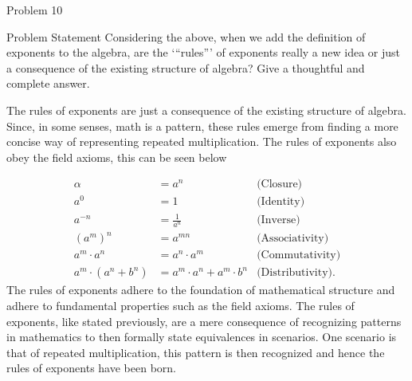\begin{problem}{Problem 10}
    \begin{statement}{Problem Statement}
        Considering the above, when we add the definition of exponents to the algebra, are the `“rules”' of exponents really a new idea or just a consequence of the existing structure of algebra? Give 
        a thoughtful and complete answer.
    \end{statement}

    \begin{highlight}[Solution]
        The rules of exponents are just a consequence of the existing structure of algebra. Since, in some senses, math is a pattern, these rules emerge from finding a more concise way of representing
        repeated multiplication. The rules of exponents also obey the field axioms, this can be seen below

        \begin{align*}
            \alpha & = a^{n} & \text{(Closure)} \\
            a^{0} & = 1 & \text{(Identity)} \\
            a^{-n} & = \frac{1}{a^{n}} & \text{(Inverse)} \\
            (a^{m})^{n} & = a^{mn} & \text{(Associativity)} \\
            a^{m}\cdot a^{n} & = a^{n}\cdot a^{m} & \text{(Commutativity)} \\
            a^{m}\cdot (a^{n} + b^{n}) & = a^{m} \cdot a^{n} + a^{m} \cdot b^{n} & \text{(Distributivity)}.
        \end{align*}
        The rules of exponents adhere to the foundation of mathematical structure and adhere to fundamental properties such as the field axioms. The rules of exponents, like stated previously, are a mere
        consequence of recognizing patterns in mathematics to then formally state equivalences in scenarios. One scenario is that of repeated multiplication, this pattern is then recognized and hence the
        rules of exponents have been born.
    \end{highlight}
\end{problem}


